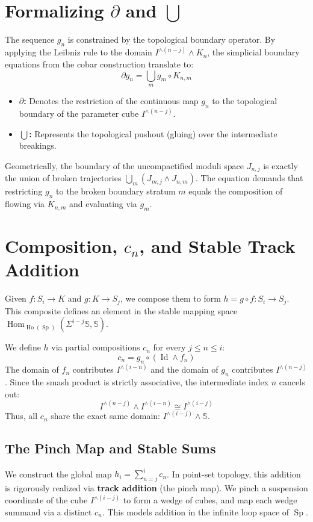 \documentclass[11pt]{article}
\begin{document}
\section{Formalizing $\partial$ and $\bigcup$}

The sequence $g_n$ is constrained by the topological boundary operator. By applying the Leibniz rule to the domain $I^{\wedge (n-j)} \wedge K_n$, the simplicial boundary equations from the cobar construction translate to:
\[ \partial g_n = \bigcup_m g_m \circ K_{n,m} \]

\begin{itemize}
    \item \textbf{$\partial$:} Denotes the restriction of the continuous map $g_n$ to the topological boundary of the parameter cube $I^{\wedge (n-j)}$.
    \item \textbf{$\bigcup$:} Represents the topological pushout (gluing) over the intermediate breakings. 
\end{itemize}

Geometrically, the boundary of the uncompactified moduli space $J_{n,j}$ is exactly the union of broken trajectories $\bigcup_m (J_{m,j} \wedge J_{n,m})$. The equation demands that restricting $g_n$ to the broken boundary stratum $m$ equals the composition of flowing via $K_{n,m}$ and evaluating via $g_m$.

\section{Composition, $c_n$, and Stable Track Addition}

Given $f: S_i \to K$ and $g: K \to S_j$, we compose them to form $h = g \circ f: S_i \to S_j$. This composite defines an element in the stable mapping space $\operatorname{Hom}_{\operatorname{Ho}(\operatorname{Sp})}(\Sigma^{i-j}\mathbb{S}, \mathbb{S})$.

We define $h$ via partial compositions $c_n$ for every $j \leq n \leq i$:
\[ c_n = g_n \circ (\operatorname{Id} \wedge f_n) \]
The domain of $f_n$ contributes $I^{\wedge(i-n)}$ and the domain of $g_n$ contributes $I^{\wedge(n-j)}$. Since the smash product is strictly associative, the intermediate index $n$ cancels out:
\[ I^{\wedge (n-j)} \wedge I^{\wedge (i-n)} \cong I^{\wedge (i-j)} \]
Thus, all $c_n$ share the exact same domain: $I^{\wedge (i-j)} \wedge \mathbb{S}$.

\subsection{The Pinch Map and Stable Sums}
We construct the global map $h_i = \sum_{n=j}^i c_n$. In point-set topology, this addition is rigorously realized via \textbf{track addition} (the pinch map). We pinch a suspension coordinate of the cube $I^{\wedge (i-j)}$ to form a wedge of cubes, and map each wedge summand via a distinct $c_n$. This models addition in the infinite loop space of $\operatorname{Sp}$.
\end{document}
